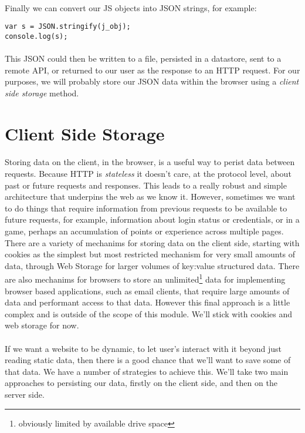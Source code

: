 \documentclass[10pt, a4paper]{article}
\begin{document}
\paragraph{} Finally we can convert our JS objects into JSON strings, for example:

\begin{lstlisting}
var s = JSON.stringify(j_obj);
console.log(s);
\end{lstlisting}

\paragraph{} This JSON could then be written to a file, persisted in a datastore, sent to a remote API, or returned to our user as the response to an HTTP request. For our purposes, we will probably store our JSON data within the browser using a \emph{client side storage} method.

\section{Client Side Storage}
\paragraph{} Storing data on the client, in the browser, is a useful way to perist data between requests. Because HTTP is \emph{stateless} it doesn't care, at the protocol level, about past or future requests and responses. This leads to a really robust and simple architecture that underpins the web as we know it. However, sometimes we want to do things that require information from previous requests to be available to future requests, for example, information about login status or credentials, or in a game, perhaps an accumulation of points or experience across multiple pages. There are a variety of mechanims for storing data on the client side, starting with cookies as the simplest but most restricted mechanism for very small amounts of data, through Web Storage for larger volumes of key:value structured data. There are also mechanims for browsers to store an unlimited\footnote{obviously limited by available drive space} data for implementing browser based applications, such as email clients, that require large amounts of data and performant access to that data. However this final approach is a little complex and is outside of the scope of this module. We'll stick with cookies and web storage for now.

\paragraph{} If we want a website to be dynamic, to let user's interact with it beyond just reading static data, then there is a good chance that we'll want to save some of that data. We have a number of strategies to achieve this. We'll take two main approaches to persisting our data, firstly on the client side, and then on the server side. 
\end{document}
